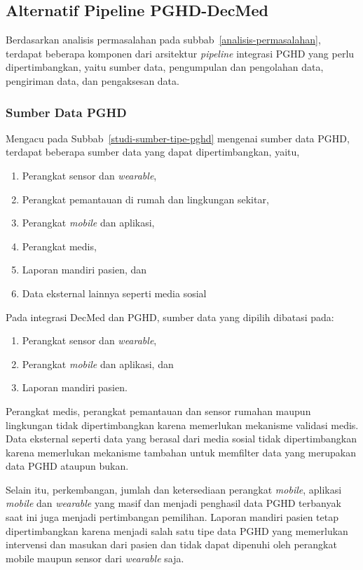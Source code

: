 \subsection{Alternatif Pipeline PGHD-DecMed}\label{alternatif-arsitektur-pipeline-pghd}

Berdasarkan analisis permasalahan pada subbab~\ref{analisis-permasalahan}, terdapat beberapa komponen dari arsitektur \textit{pipeline} integrasi PGHD yang perlu dipertimbangkan, yaitu sumber data, pengumpulan dan pengolahan data, pengiriman data, dan pengaksesan data.

\subsubsection{Sumber Data PGHD}\label{alternatif-sumber-data}

Mengacu pada Subbab~\ref{studi-sumber-tipe-pghd} mengenai sumber data PGHD, terdapat beberapa sumber data yang dapat dipertimbangkan, yaitu,

\begin{enumerate}
    \item Perangkat sensor dan \textit{wearable},
    \item Perangkat pemantauan di rumah dan lingkungan sekitar,
    \item Perangkat \textit{mobile} dan aplikasi,
    \item Perangkat medis,
    \item Laporan mandiri pasien, dan
    \item Data eksternal lainnya seperti media sosial
\end{enumerate}

Pada integrasi DecMed dan PGHD, sumber data yang dipilih dibatasi pada:
\begin{enumerate}
  \item Perangkat sensor dan \textit{wearable},
  \item Perangkat \textit{mobile} dan aplikasi, dan
  \item Laporan mandiri pasien.
\end{enumerate}

Perangkat medis, perangkat pemantauan dan sensor rumahan maupun lingkungan tidak dipertimbangkan karena memerlukan mekanisme validasi medis.
Data eksternal seperti data yang berasal dari media sosial tidak dipertimbangkan karena memerlukan mekanisme tambahan untuk memfilter data yang merupakan data PGHD ataupun bukan.

Selain itu, perkembangan, jumlah dan ketersediaan perangkat \textit{mobile}, aplikasi \textit{mobile} dan \textit{wearable} yang masif dan menjadi penghasil data PGHD terbanyak saat ini juga menjadi pertimbangan pemilihan.
Laporan mandiri pasien tetap dipertimbangkan karena menjadi salah satu tipe data PGHD yang memerlukan intervensi dan masukan dari pasien dan tidak dapat dipenuhi oleh perangkat mobile maupun sensor dari \textit{wearable} saja.

